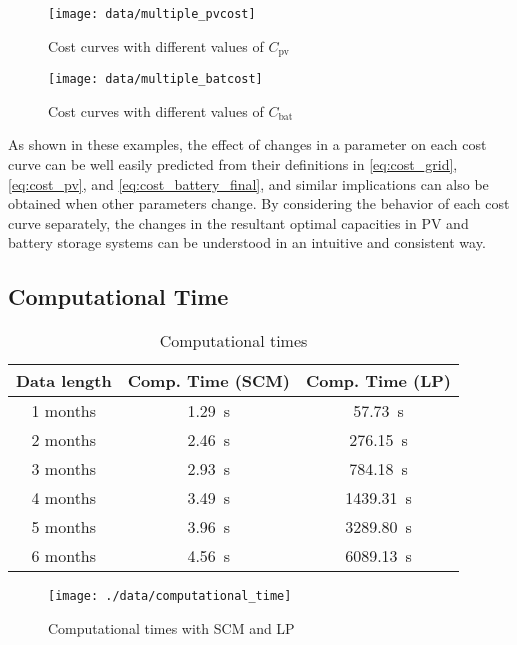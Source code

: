 \documentclass[lettersize,journal]{IEEEtran}
\begin{document}
\begin{figure}[!t]
 \centering
   \texttt{[image: data/multiple\_pvcost]}  \caption{Cost curves with different values of $C_\mathrm{pv}$   \label{fig:cost_curves_diff_pv}} 
\end{figure}

\begin{figure}[!t]
 \centering
  \texttt{[image: data/multiple\_batcost]} \caption{Cost curves with different values of $C_\mathrm{bat}$ \label{fig:cost_curves_diff_bat}} 
\end{figure}


%
As shown in these examples, the effect of changes in a parameter on each cost curve can be well easily predicted from their definitions in \eqref{eq:cost_grid}, \eqref{eq:cost_pv}, and \eqref{eq:cost_battery_final}, 
and similar implications can also be obtained when other parameters change. 
By considering the behavior of each cost curve separately, the changes in the resultant optimal capacities in PV and battery storage systems can be understood in an intuitive and consistent way. 



\subsection{Computational Time}


\begin{table}[!t]
 \centering
 \caption{Computational times}
 \label{tab:time}
 \begin{tabular}{ c | c c }
 Data length & Comp. Time (SCM) &  Comp. Time (LP) \\
 \hline 
 1 months & \SI{1.29}{s} & \SI{57.73}{s} \\ 
 2 months & \SI{2.46}{s} & \SI{276.15}{s} \\  
 3 months & \SI{2.93}{s} & \SI{784.18}{s} \\  
 4 months & \SI{3.49}{s} & \SI{1439.31}{s} \\  
 5 months & \SI{3.96}{s} & \SI{3289.80}{s} \\  
 6 months & \SI{4.56}{s} & \SI{6089.13}{s} \\   
\end{tabular}
\end{table}

\begin{figure}[!t]
 \centering
 \texttt{[image: ./data/computational\_time]}
 \caption{Computational times with SCM and LP} \label{fig:time}
\end{figure}
\end{document}
